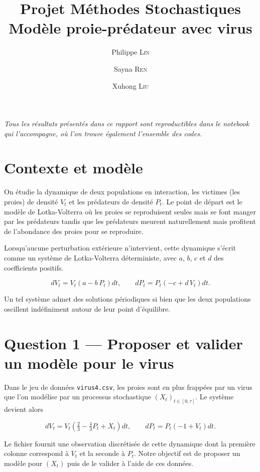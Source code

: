 \documentclass[11pt,a4paper]{article}
\title{Projet Méthodes Stochastiques\\[0.3em]
       \large Modèle proie-prédateur avec virus}
\author{Philippe \textsc{Lin} \and Sayna \textsc{Ren} \and Xuhong \textsc{Liu}}
\date{}
\begin{document}
\maketitle

\textit{Tous les résultats présentés dans ce rapport sont reproductibles dans le notebook qui l'accompagne, où l'on trouve également l'ensemble des codes.}

\section*{Contexte et modèle}

On étudie la dynamique de deux populations en interaction, les victimes (les proies) de densité $V_t$ et les prédateurs de densité $P_t$. Le point de départ est le modèle de Lotka-Volterra où les proies se reproduisent seules mais se font manger par les prédateurs tandis que les prédateurs meurent naturellement mais profitent de l'abondance des proies pour se reproduire.

Lorsqu'aucune perturbation extérieure n'intervient, cette dynamique s'écrit comme un système de Lotka-Volterra déterministe, avec $a$, $b$, $c$ et $d$ des coefficients positifs.

\begin{equation}\label{eq:base}
  dV_t = V_t\left(a - b\,P_t\right)dt,
  \qquad
  dP_t = P_t\left(-c + d\,V_t\right)dt.
\end{equation}

Un tel système admet des solutions périodiques si bien que les deux populations oscillent indéfiniment autour de leur point d'équilibre.

\section*{Question 1 — Proposer et valider un modèle pour le virus}

Dans le jeu de données \texttt{virus4.csv}, les proies sont en plus frappées par un virus que l'on modélise par un processus stochastique $(X_t)_{t\in[0,\tau]}$. Le système devient alors

\begin{equation}\label{eq:systeme}
  dV_t = V_t\left(\tfrac{2}{3} - \tfrac{4}{3}P_t + X_t\right)dt,
  \qquad
  dP_t = P_t\left(-1 + V_t\right)dt.
\end{equation}

Le fichier fournit une observation discrétisée de cette dynamique dont la première colonne correspond à $V_t$ et la seconde à $P_t$. Notre objectif est de proposer un modèle pour $(X_t)$ puis de le valider à l'aide de ces données.
\end{document}
